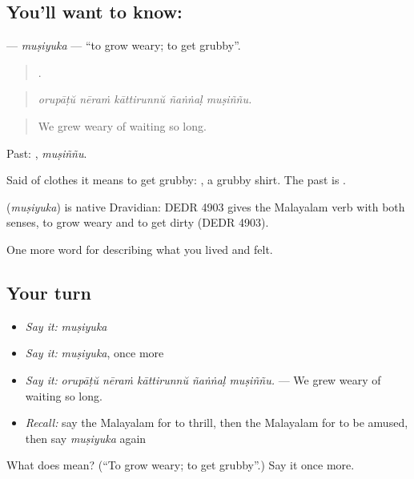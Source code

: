 \subsection*{You'll want to know: }
\textbf{} — \emph{muṣiyuka} — \textquotedblleft{}to grow weary; to get grubby\textquotedblright{}.

\begin{quote}
    .
\end{quote}

\begin{quote}
\emph{orupāṭŭ nēraṁ kāttirunnŭ ñaṅṅaḷ muṣiññu.}
\end{quote}

\begin{quote}
We grew weary of waiting so long.
\end{quote}

Past: , \emph{muṣiññu}.

Said of clothes it means to get grubby:  , a grubby shirt. The past is .

\begin{cousinweb}
\textbf{} (\emph{muṣiyuka}) is native Dravidian: DEDR 4903 gives the Malayalam verb with both senses, to grow weary and to get dirty (DEDR 4903).
\end{cousinweb}

\begin{grammarlens}[title={What you've built}]
One more word for describing what you lived and felt.
\end{grammarlens}

\subsection*{Your turn}
\begin{itemize}
\raggedright
  \item \emph{Say it:} \emph{muṣiyuka}
  \item \emph{Say it:} \emph{muṣiyuka}, once more
  \item \emph{Say it:} \emph{orupāṭŭ nēraṁ kāttirunnŭ ñaṅṅaḷ muṣiññu.} — We grew weary of waiting so long.
  \item \emph{Recall:} say the Malayalam for to thrill, then the Malayalam for to be amused, then say \emph{muṣiyuka} again
\end{itemize}

\begin{tcolorbox}[breakable,colback=teal!4,colframe=teal!35!black,title={Before you move on}]
What does  mean? (\textquotedblleft{}To grow weary; to get grubby\textquotedblright{}.) Say it once more.
\end{tcolorbox}
